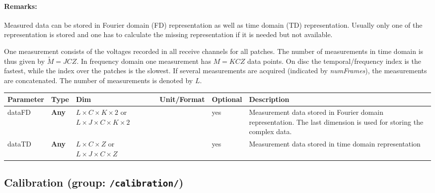 \documentclass[landscape]{article} %
\newcommand{\inl}[1]{\lstinline[columns=fixed]{#1}}
\newcommand{\inltab}[1]{{\ttfamily\bfseries\color{blue}#1}}
\newcommand{\inlvar}[1]{{\ttfamily#1}}
\begin{document}
\begin{multicols}{2}

\paragraph{Remarks:} 
Measured data can be stored in Fourier domain (FD) representation as well as time domain (TD) representation. Usually only one of the representation is stored and one has to calculate the missing representation if it is needed but not available.

One measurement consists of the voltages recorded in all receive channels for all patches. The number of measurements in time domain is thus given by $\widetilde{M} = J C Z$. In frequency domain one measurement has $M = K C Z$ data points. On disc the temporal/frequency index is the fastest, while the index over the patches is the slowest. If several measurements are acquired (indicated by \textit{numFrames}), the measurements are concatenated. The number of measurements is denoted by $L$. \newline

\end{multicols}

\noindent \begin{tabularx}{\columnwidth}{llp{3cm}llX} 
\textbf{Parameter} & \textbf{Type} & \textbf{Dim} & \textbf{Unit/Format} & \textbf{Optional} & \textbf{Description} \\ \hline 
\inlvar{dataFD} & \inltab{Any} & $L \times C \times K \times 2$  or $L \times J \times C \times K \times 2$  & & yes & Measurement data stored in Fourier domain representation. The last dimension is used for storing the complex data. \\  \hline
\inlvar{dataTD} & \inltab{Any} & $L \times C \times Z$ or \newline $L \times J \times C \times Z$ & & yes & Measurement data stored in time domain representation \\ \hline 
\end{tabularx}

\subsection{Calibration (group: \inl{/calibration/})}
\end{document}
